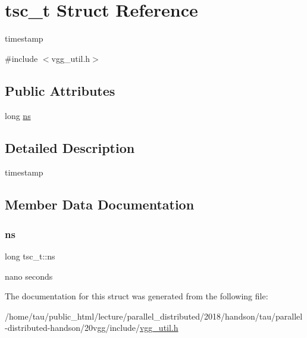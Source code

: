 \hypertarget{structtsc__t}{}\section{tsc\+\_\+t Struct Reference}
\label{structtsc__t}


timestamp  




{\ttfamily \#include $<$vgg\+\_\+util.\+h$>$}

\subsection*{Public Attributes}
\begin{DoxyCompactItemize}
\item 
long \hyperlink{structtsc__t_a96267c29e7c7ad186ee3f618b8e1615e}{ns}
\end{DoxyCompactItemize}


\subsection{Detailed Description}
timestamp 

\subsection{Member Data Documentation}
\mbox{\label{structtsc__t_a96267c29e7c7ad186ee3f618b8e1615e}} 
\subsubsection{\texorpdfstring{ns}{ns}}
{\footnotesize\ttfamily long tsc\+\_\+t\+::ns}

nano seconds 

The documentation for this struct was generated from the following file\+:\begin{DoxyCompactItemize}
\item 
/home/tau/public\+\_\+html/lecture/parallel\+\_\+distributed/2018/handson/tau/parallel-\/distributed-\/handson/20vgg/include/\hyperlink{vgg__util_8h}{vgg\+\_\+util.\+h}\end{DoxyCompactItemize}
